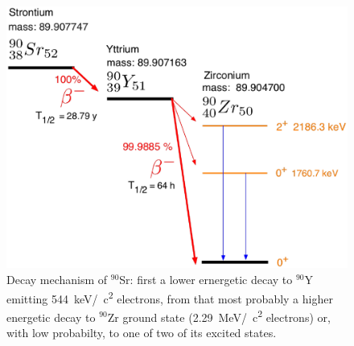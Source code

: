   \begin{figure}
  \centering
  	\includegraphics[width = 0.5 \textwidth]{graphics/cobalt/Sr90_decay.eps}
  	\caption{Decay mechanism of $^{90}$Sr: first a lower ernergetic decay to $^{90}$Y emitting \SI{544}{\kilo\electronvolt}/\SI{}{\square c} electrons, from that most probably a higher energetic decay to $^{90}$Zr ground state (\SI{2.29}{\mega\electronvolt}/\SI{}{\square c} electrons) or, with low probabilty, to one of two of its excited states.}
  \end{figure}

